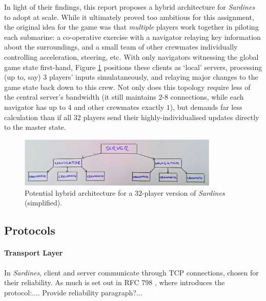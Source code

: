 \documentclass[a4paper, 9pt]{article}
\begin{document}
\begin{flushleft}
\vspace{5pt}\noindent
In light of their findings, this report proposes a hybrid architecture for \textit{Sardines} to adopt at scale. While it ultimately proved too ambitious for this assignment, the original idea for the game was that \textit{multiple} players work together in piloting each submarine: a co-operative exercise with a navigator relaying key information about the surroundings, and a small team of other crewmates individually controlling acceleration, steering, etc. With only navigators witnessing the global game state first-hand, Figure \ref{Hybrid Architecture} positions these clients as `local' servers, processing (up to, say) $3$ players' inputs simulataneously, and relaying major changes to the game state back down to this crew. Not only does this topology require less of the central server's bandwidth (it still maintains $2$-$8$ connections, while each navigator has up to $4$ and other crewmates exactly $1$),  but demands far less calculation than if all $32$ players send their highly-individualised updates directly to the master state.

\vspace{5pt}\noindent
\begin{figure}[h]
\centering
\includegraphics[width=0.85\textwidth]{Hybrid Architecture}
\caption{Potential hybrid architecture for a $32$-player version of \textit{Sardines} (simplified).}
\label{Hybrid Architecture}
\end{figure}

\subsection*{Protocols}

\paragraph{Transport Layer} In \textit{Sardines}, client and server communicate through TCP connections, chosen for their reliability. 
As much is set out in RFC 798 \citeyearpar{rfc793}, where \citeauthor{rfc793} introduces the protocol:.... %
Provide reliability paragraph?...


\end{flushleft}
\end{document}
